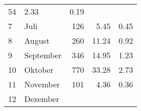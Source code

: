 \begin{longtable}{lXrrr}
       \num{54} &
       \num[round-mode=places,round-precision=2]{2,33} &
         \num[round-mode=places,round-precision=2]{0,19} \\

     7 &
     \multicolumn{1}{X}{ Juli   } &


       \num{126} &
       \num[round-mode=places,round-precision=2]{5,45} &
         \num[round-mode=places,round-precision=2]{0,45} \\

     8 &
     \multicolumn{1}{X}{ August   } &


       \num{260} &
       \num[round-mode=places,round-precision=2]{11,24} &
         \num[round-mode=places,round-precision=2]{0,92} \\

     9 &
     \multicolumn{1}{X}{ September   } &


       \num{346} &
       \num[round-mode=places,round-precision=2]{14,95} &
         \num[round-mode=places,round-precision=2]{1,23} \\

     10 &
     \multicolumn{1}{X}{ Oktober   } &


       \num{770} &
       \num[round-mode=places,round-precision=2]{33,28} &
         \num[round-mode=places,round-precision=2]{2,73} \\

     11 &
     \multicolumn{1}{X}{ November   } &


       \num{101} &
       \num[round-mode=places,round-precision=2]{4,36} &
         \num[round-mode=places,round-precision=2]{0,36} \\

     12 &
     \multicolumn{1}{X}{ Dezember   } &



\end{longtable}
